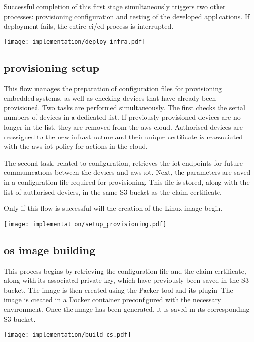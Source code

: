 Successful completion of this first stage simultaneously triggers two other processes: provisioning configuration and testing of the developed applications. If deployment fails, the entire \acrshort{ci}/\acrshort{cd} process is interrupted.
\begin{center}
    \begingroup
    \texttt{[image: implementation/deploy\_infra.pdf]}
    \label{fig:deploy_infra}
    \endgroup
\end{center}

\subsection{\Gls{provisioning} setup}
This flow manages the preparation of configuration files for provisioning embedded systems, as well as checking devices that have already been provisioned. Two tasks are performed simultaneously. The first checks the serial numbers of devices in a dedicated list. If previously provisioned devices are no longer in the list, they are removed from the \gls{aws} \gls{cloud}. Authorised devices are reassigned to the new infrastructure and their unique certificate is reassociated with the \gls{aws} \acrshort{iot} policy for actions in the \gls{cloud}.

The second task, related to configuration, retrieves the \acrshort{iot} endpoints for future communications between the devices and \gls{aws} \acrshort{iot}. Next, the parameters are saved in a configuration file required for provisioning. This file is stored, along with the list of authorised devices, in the same S3 bucket as the claim certificate.

Only if this flow is successful will the creation of the Linux image begin.
\begin{center}
    \begingroup
    \texttt{[image: implementation/setup\_provisioning.pdf]}
    \label{fig:setup_provisioning}
    \endgroup
\end{center}

\subsection{\acrshort{os} image building}
This process begins by retrieving the configuration file and the claim certificate, along with its associated private key, which have previously been saved in the S3 bucket. The image is then created using the Packer tool and its plugin. The image is created in a Docker container preconfigured with the necessary environment. Once the image has been generated, it is saved in its corresponding S3 bucket.
\begin{center}
    \begingroup
    \texttt{[image: implementation/build\_os.pdf]}
    \label{fig:build_os}
    \endgroup
\end{center}

